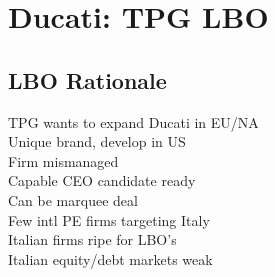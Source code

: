 \section{Ducati: TPG LBO}
	\subsection*{LBO Rationale}
	TPG wants to expand Ducati in EU/NA\\
	Unique brand, develop in US\\
	Firm mismanaged\\
	Capable CEO candidate ready\\
	Can be marquee deal\\
	Few intl PE firms targeting Italy\\
	Italian firms ripe for LBO's\\
	Italian equity/debt markets weak
	